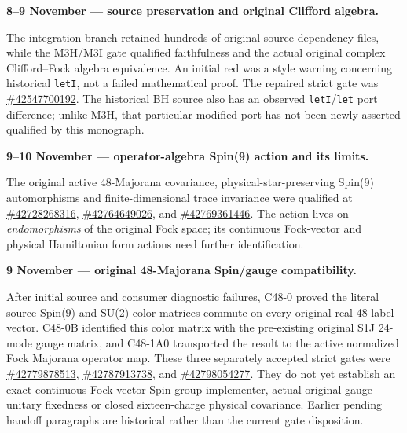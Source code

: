\par\medskip\noindent\textbf{8--9 November --- source preservation and original Clifford algebra.}\par\smallskip
The integration branch retained hundreds of original source dependency
files, while the M3H/M3I gate qualified faithfulness and the actual
original complex Clifford--Fock algebra equivalence.
An initial red was a style warning concerning historical \texttt{letI},
not a failed mathematical proof. The repaired strict gate was
\href{https://github.com/etblink/math/actions/runs/42547700192}{\#42547700192}.
The historical BH source also has an observed \texttt{letI}/\texttt{let}
port difference; unlike M3H, that particular modified port has not
been newly asserted qualified by this monograph.

\par\medskip\noindent\textbf{9--10 November --- operator-algebra Spin(9) action and its limits.}\par\smallskip
The original active 48-Majorana covariance,
physical-star-preserving Spin(9) automorphisms and finite-dimensional
trace invariance were qualified at
\href{https://github.com/etblink/math/actions/runs/42728268316}{\#42728268316},
\href{https://github.com/etblink/math/actions/runs/42764649026}{\#42764649026}, and
\href{https://github.com/etblink/math/actions/runs/42769361446}{\#42769361446}.
The action lives on \emph{endomorphisms} of the original Fock space;
its continuous Fock-vector and physical Hamiltonian form actions need
further identification.

\par\medskip\noindent\textbf{9 November --- original 48-Majorana Spin/gauge compatibility.}\par\smallskip
After initial source and consumer diagnostic failures, C48-0 proved the
literal source Spin(9) and SU(2) color matrices commute on every original
real 48-label vector. C48-0B identified this color matrix with the
pre-existing original S1J 24-mode gauge matrix, and C48-1A0 transported
the result to the active normalized Fock Majorana operator map. These
three separately accepted strict gates were
\href{https://github.com/etblink/math/actions/runs/42779878513}{\#42779878513},
\href{https://github.com/etblink/math/actions/runs/42787913738}{\#42787913738},
and
\href{https://github.com/etblink/math/actions/runs/42798054277}{\#42798054277}.
They do not yet establish an exact continuous Fock-vector Spin group
implementer, actual original gauge-unitary fixedness or closed
sixteen-charge physical covariance. Earlier pending handoff paragraphs
are historical rather than the current gate disposition.

